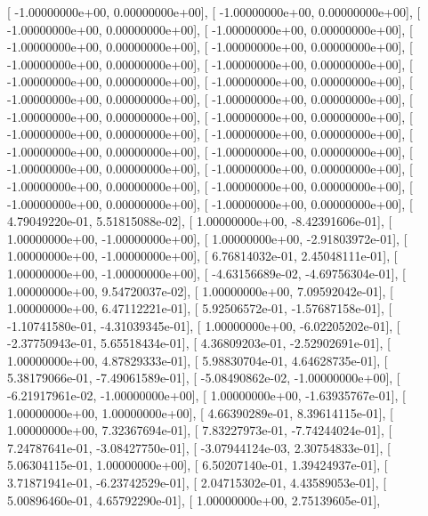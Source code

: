 \documentclass{article}
\begin{document}
       [ -1.00000000e+00,   0.00000000e+00],
       [ -1.00000000e+00,   0.00000000e+00],
       [ -1.00000000e+00,   0.00000000e+00],
       [ -1.00000000e+00,   0.00000000e+00],
       [ -1.00000000e+00,   0.00000000e+00],
       [ -1.00000000e+00,   0.00000000e+00],
       [ -1.00000000e+00,   0.00000000e+00],
       [ -1.00000000e+00,   0.00000000e+00],
       [ -1.00000000e+00,   0.00000000e+00],
       [ -1.00000000e+00,   0.00000000e+00],
       [ -1.00000000e+00,   0.00000000e+00],
       [ -1.00000000e+00,   0.00000000e+00],
       [ -1.00000000e+00,   0.00000000e+00],
       [ -1.00000000e+00,   0.00000000e+00],
       [ -1.00000000e+00,   0.00000000e+00],
       [ -1.00000000e+00,   0.00000000e+00],
       [ -1.00000000e+00,   0.00000000e+00],
       [ -1.00000000e+00,   0.00000000e+00],
       [ -1.00000000e+00,   0.00000000e+00],
       [ -1.00000000e+00,   0.00000000e+00],
       [ -1.00000000e+00,   0.00000000e+00],
       [ -1.00000000e+00,   0.00000000e+00],
       [ -1.00000000e+00,   0.00000000e+00],
       [ -1.00000000e+00,   0.00000000e+00],
       [  4.79049220e-01,   5.51815088e-02],
       [  1.00000000e+00,  -8.42391606e-01],
       [  1.00000000e+00,  -1.00000000e+00],
       [  1.00000000e+00,  -2.91803972e-01],
       [  1.00000000e+00,  -1.00000000e+00],
       [  6.76814032e-01,   2.45048111e-01],
       [  1.00000000e+00,  -1.00000000e+00],
       [ -4.63156689e-02,  -4.69756304e-01],
       [  1.00000000e+00,   9.54720037e-02],
       [  1.00000000e+00,   7.09592042e-01],
       [  1.00000000e+00,   6.47112221e-01],
       [  5.92506572e-01,  -1.57687158e-01],
       [ -1.10741580e-01,  -4.31039345e-01],
       [  1.00000000e+00,  -6.02205202e-01],
       [ -2.37750943e-01,   5.65518434e-01],
       [  4.36809203e-01,  -2.52902691e-01],
       [  1.00000000e+00,   4.87829333e-01],
       [  5.98830704e-01,   4.64628735e-01],
       [  5.38179066e-01,  -7.49061589e-01],
       [ -5.08490862e-02,  -1.00000000e+00],
       [ -6.21917961e-02,  -1.00000000e+00],
       [  1.00000000e+00,  -1.63935767e-01],
       [  1.00000000e+00,   1.00000000e+00],
       [  4.66390289e-01,   8.39614115e-01],
       [  1.00000000e+00,   7.32367694e-01],
       [  7.83227973e-01,  -7.74244024e-01],
       [  7.24787641e-01,  -3.08427750e-01],
       [ -3.07944124e-03,   2.30754833e-01],
       [  5.06304115e-01,   1.00000000e+00],
       [  6.50207140e-01,   1.39424937e-01],
       [  3.71871941e-01,  -6.23742529e-01],
       [  2.04715302e-01,   4.43589053e-01],
       [  5.00896460e-01,   4.65792290e-01],
       [  1.00000000e+00,   2.75139605e-01],
\end{document}
